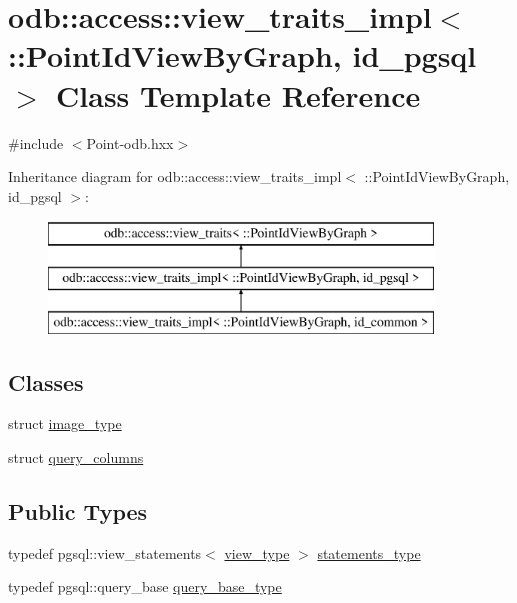 \hypertarget{classodb_1_1access_1_1view__traits__impl_3_01_1_1_point_id_view_by_graph_00_01id__pgsql_01_4}{}\section{odb\+:\+:access\+:\+:view\+\_\+traits\+\_\+impl$<$ \+:\+:Point\+Id\+View\+By\+Graph, id\+\_\+pgsql $>$ Class Template Reference}
\label{classodb_1_1access_1_1view__traits__impl_3_01_1_1_point_id_view_by_graph_00_01id__pgsql_01_4}


{\ttfamily \#include $<$Point-\/odb.\+hxx$>$}

Inheritance diagram for odb\+:\+:access\+:\+:view\+\_\+traits\+\_\+impl$<$ \+:\+:Point\+Id\+View\+By\+Graph, id\+\_\+pgsql $>$\+:\begin{figure}[H]
\begin{center}
\leavevmode
\includegraphics[height=3.000000cm]{d0/d06/classodb_1_1access_1_1view__traits__impl_3_01_1_1_point_id_view_by_graph_00_01id__pgsql_01_4}
\end{center}
\end{figure}
\subsection*{Classes}
\begin{DoxyCompactItemize}
\item 
struct \hyperlink{structodb_1_1access_1_1view__traits__impl_3_01_1_1_point_id_view_by_graph_00_01id__pgsql_01_4_1_1image__type}{image\+\_\+type}
\item 
struct \hyperlink{structodb_1_1access_1_1view__traits__impl_3_01_1_1_point_id_view_by_graph_00_01id__pgsql_01_4_1_1query__columns}{query\+\_\+columns}
\end{DoxyCompactItemize}
\subsection*{Public Types}
\begin{DoxyCompactItemize}
\item 
typedef pgsql\+::view\+\_\+statements$<$ \hyperlink{classodb_1_1access_1_1view__traits_3_01_1_1_point_id_view_by_graph_01_4_a8699a213d1dc23abeab95aa38ddb3d07}{view\+\_\+type} $>$ \hyperlink{classodb_1_1access_1_1view__traits__impl_3_01_1_1_point_id_view_by_graph_00_01id__pgsql_01_4_a2301c838c78fe5f575b2751dda7de447}{statements\+\_\+type}
\item 
typedef pgsql\+::query\+\_\+base \hyperlink{classodb_1_1access_1_1view__traits__impl_3_01_1_1_point_id_view_by_graph_00_01id__pgsql_01_4_ab4e7cb641cd3d4b4a38077b108884feb}{query\+\_\+base\+\_\+type}
\end{DoxyCompactItemize}
